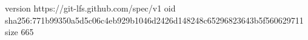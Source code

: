 version https://git-lfs.github.com/spec/v1
oid sha256:771b99350a5d5c06c4eb929b1046d2426d148248c65296823643b5f560629711
size 665
